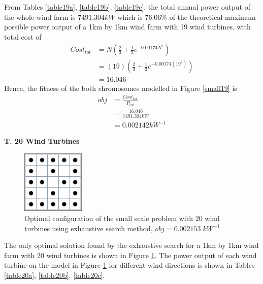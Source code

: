         From Tables \ref{table19a}, \ref{table19b}, \ref{table19c}, the total annual power output of the whole wind farm is $7491.304kW$ which is $76.06\%$ of the theoretical maximum possible power output of a 1km by 1km wind farm with 19 wind turbines, with total cost of
        \begin{align*}
            Cost_{tot}
            &= N\left(\frac{2}{3} + \frac{1}{3}e^{-0.00174N^2}\right) \\
            &= \left(19\right)\left(\frac{2}{3} + \frac{1}{3}e^{-0.00174\left(19^2\right)}\right) \\
            &=16.046
        \end{align*}
        Hence, the fitness of the both chromosomes modelled in Figure \ref{small19} is
        \begin{align*}
            obj
            &=\frac{Cost_{tot}}{P_{tot}} \\
            &=\frac{16.046}{7491.304kW} \\
            &=0.002142kW^{-1}
        \end{align*}
        
    \textbf{T. 20 Wind Turbines}
        \begin{figure}[H]
            \centering
            \includegraphics[width=3cm]{Figures/Chromosomes/20.png}
            \caption{Optimal configuration of the small scale problem with 20 wind turbines using exhaustive search method, $obj=0.002153\;kW^{-1}$}
            \label{small20}
        \end{figure}
        
        The only optimal solution found by the exhaustive search for a 1km by 1km wind farm with 20 wind turbines is shown in Figure \ref{small20}. The power output of each wind turbine on the model in Figure \ref{small20} for different wind directions is shown in Tables \ref{table20a}, \ref{table20b}, \ref{table20c}.
        
